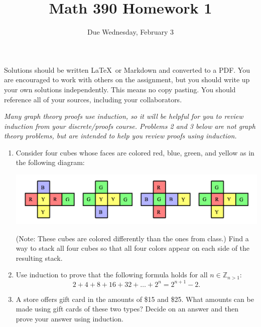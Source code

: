 \documentclass{article}
\title{Math 390 Homework 1}
\author{Due Wednesday, February 3}
\date{}
\begin{document}

\maketitle

\setlength{\parindent}{0em} %
\setlength{\parskip}{1em} %



Solutions should be written \LaTeX\ or Markdown and converted to a PDF. You are encouraged to work with others
on the assignment, but you should write up your own solutions independently. This means no copy pasting. You should
reference all of your sources, including your collaborators. 

{\it Many graph theory proofs use induction, so it will be helpful for you to review induction from
your discrete/proofs course. Problems 2 and 3 below are not graph theory problems, but are
intended to help you review proofs using induction.}

\begin{enumerate}
	\item Consider four cubes whose faces are colored red, blue, green, and yellow as in the
following diagram:
	\begin{center}
		\includegraphics[width = .8\textwidth]{cubes.png}
	\end{center}
(Note: These cubes are colored differently than the ones from class.) Find a way to
stack all four cubes so that all four colors appear on each side of the resulting stack.

	\item Use induction to prove that the following formula holds for all $n \in \mathbb Z_{n>1}$:
	\[
		2 + 4 + 8 + 16 + 32 + \ldots + 2^n = 2^{n+1} - 2.
	\]

	\item A store offers gift card in the amounts of \$15 and \$25. What amounts can be made
using gift cards of these two types? Decide on an answer and then prove your answer
using induction.

\end{enumerate}
\end{document}
